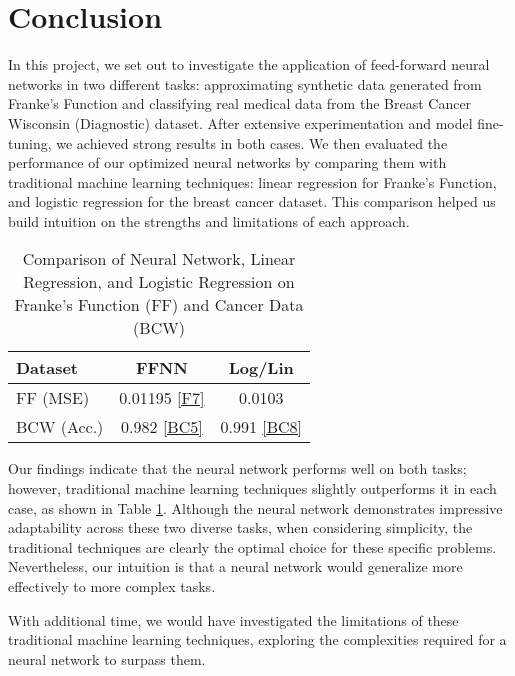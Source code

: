 \documentclass{article}
\begin{document}
\section*{Conclusion}

\begin{multicols}{2}
In this project, we set out to investigate the application of feed-forward neural networks in two different tasks: approximating synthetic data generated from Franke's Function and classifying real medical data from the Breast Cancer Wisconsin (Diagnostic) dataset. After extensive experimentation and model fine-tuning, we achieved strong results in both cases. We then evaluated the performance of our optimized neural networks by comparing them with traditional machine learning techniques: linear regression for Franke's Function, and logistic regression for the breast cancer dataset. This comparison helped us build intuition on the strengths and limitations of each approach.

\begin{table}[H]
\centering
\begin{tabular}{|l|c|c|}
\hline
\textbf{Dataset} & \textbf{FFNN} & \textbf{Log/Lin} \\
\hline
FF (MSE) & 0.01195 \hyperref[fig:F7]{[F7]} & 0.0103 \cite{oa_brovold_eg_hansen_hg_kornstad_regression_2024}\\
\hline
BCW (Acc.) & 0.982 \hyperref[fig:BC5]{[BC5]} & 0.991 \hyperref[fig:BC8]{[BC8]}\\
\hline
\end{tabular}
\caption{Comparison of Neural Network, Linear Regression, and Logistic Regression on Franke's Function (FF) and Cancer Data (BCW)}
\label{tab:table3}
\end{table}

Our findings indicate that the neural network performs well on both tasks; however, traditional machine learning techniques slightly outperforms it in each case, as shown in Table \ref{tab:table3}. Although the neural network demonstrates impressive adaptability across these two diverse tasks, when considering simplicity, the traditional techniques are clearly the optimal choice for these specific problems. Nevertheless, our intuition is that a neural network would generalize more effectively to more complex tasks.

With additional time, we would have investigated the limitations of these traditional machine learning techniques, exploring the complexities required for a neural network to surpass them.


\end{multicols}
\end{document}
